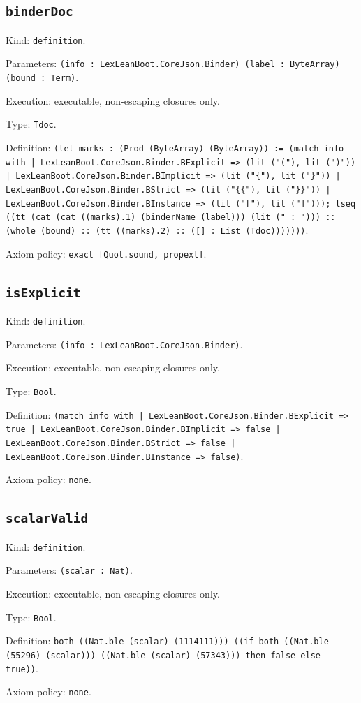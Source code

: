 \documentclass[11pt]{article}
\begin{document}
\subsection*{\texttt{binderDoc}}
\noindent Kind: \texttt{definition}.\par
\noindent Parameters: \texttt{(info : LexLeanBoot.CoreJson.Binder) (label : ByteArray) (bound : Term)}.\par
\noindent Execution: executable, non-escaping closures only.\par
\noindent Type: \texttt{Tdoc}.\par
\noindent Definition: \texttt{(let marks : (Prod (ByteArray) (ByteArray)) := (match info with | LexLeanBoot.CoreJson.Binder.BExplicit => (lit ("("), lit (")")) | LexLeanBoot.CoreJson.Binder.BImplicit => (lit ("\{"), lit ("\}")) | LexLeanBoot.CoreJson.Binder.BStrict => (lit ("\{\{"), lit ("\}\}")) | LexLeanBoot.CoreJson.Binder.BInstance => (lit ("["), lit ("]"))); tseq ((tt (cat (cat ((marks).1) (binderName (label))) (lit (" : "))) :: (whole (bound) :: (tt ((marks).2) :: ([] : List (Tdoc)))))))}.\par
\noindent Axiom policy: \texttt{exact [Quot.sound, propext]}.\par
\subsection*{\texttt{isExplicit}}
\noindent Kind: \texttt{definition}.\par
\noindent Parameters: \texttt{(info : LexLeanBoot.CoreJson.Binder)}.\par
\noindent Execution: executable, non-escaping closures only.\par
\noindent Type: \texttt{Bool}.\par
\noindent Definition: \texttt{(match info with | LexLeanBoot.CoreJson.Binder.BExplicit => true | LexLeanBoot.CoreJson.Binder.BImplicit => false | LexLeanBoot.CoreJson.Binder.BStrict => false | LexLeanBoot.CoreJson.Binder.BInstance => false)}.\par
\noindent Axiom policy: \texttt{none}.\par
\subsection*{\texttt{scalarValid}}
\noindent Kind: \texttt{definition}.\par
\noindent Parameters: \texttt{(scalar : Nat)}.\par
\noindent Execution: executable, non-escaping closures only.\par
\noindent Type: \texttt{Bool}.\par
\noindent Definition: \texttt{both ((Nat.ble (scalar) (1114111))) ((if both ((Nat.ble (55296) (scalar))) ((Nat.ble (scalar) (57343))) then false else true))}.\par
\noindent Axiom policy: \texttt{none}.\par
\end{document}
